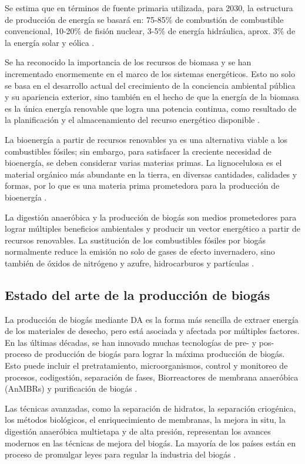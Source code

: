 \documentclass[a4paper,10pt]{article}
\begin{document}
Se estima que en términos de fuente primaria utilizada, para 2030, la estructura de producción de energía se basará en: 75-85\% de combustión de combustible convencional, 10-20\% de fisión nuclear, 3-5\% de energía hidráulica, aprox. 3\% de la energía solar y eólica \cite{Popescu2010}.

Se ha reconocido la importancia de los recursos de biomasa y se han incrementado enormemente en el marco de los sistemas energéticos. Esto no solo se basa en el desarrollo actual del crecimiento de la conciencia ambiental pública y su apariencia exterior, sino también en el hecho de que la energía de la biomasa es la única energía renovable que logra una potencia continua, como resultado de la planificación y el almacenamiento del recurso energético disponible \cite{Koenig2008}.

La bioenergía a partir de recursos renovables ya es una alternativa viable a los combustibles fósiles; sin embargo, para satisfacer la creciente necesidad de bioenergía, se deben considerar varias materias primas. La lignocelulosa es el material orgánico más abundante en la tierra, en diversas cantidades, calidades y formas, por lo que es una materia prima prometedora para la producción de bioenergía \cite{Petersson2007}.

La digestión anaeróbica y la producción de biogás son medios prometedores para lograr múltiples beneficios ambientales y producir un vector energético a partir de recursos renovables. La sustitución de los combustibles fósiles por biogás normalmente reduce la emisión no solo de gases de efecto invernadero, sino también de óxidos de nitrógeno y azufre, hidrocarburos y partículas \cite{Boerjesson2006}.

\subsection{Estado del arte de la producción de biogás}
La producción de biogás mediante DA es la forma más sencilla de extraer energía de los materiales de desecho, pero está asociada y afectada por múltiples factores. En las últimas décadas, se han innovado muchas tecnologías de pre- y pos- proceso de producción de biogás para lograr la máxima producción de biogás. Esto puede incluir el pretratamiento, microorganismos, control y monitoreo de procesos, codigestión, separación de fases, Biorreactores de membrana anaeróbica (AnMBRs) y purificación de biogás \cite{Maurya2019}.

Las técnicas avanzadas, como la separación de hidratos, la separación criogénica, los métodos biológicos, el enriquecimiento de membranas, la mejora in situ, la digestión anaeróbica multietapa y de alta presión, representan los avances modernos en las técnicas de mejora del biogás. La mayoría de los países están en proceso de promulgar leyes para regular la industria del biogás \cite{Korbag2020}.
\end{document}
